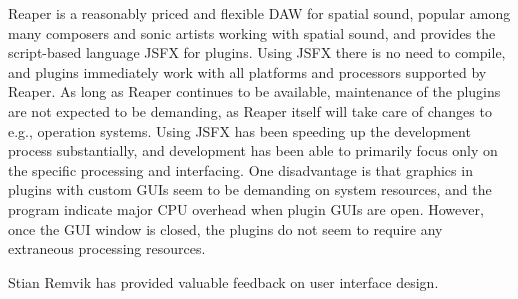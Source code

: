 \documentclass{article}
\begin{document}
Reaper is a reasonably priced and flexible DAW for spatial sound, popular among many composers and sonic artists working with spatial sound, and provides the script-based language JSFX for plugins.
Using JSFX there is no need to compile, and plugins immediately work with all platforms and processors supported by Reaper.
As long as Reaper continues to be available, maintenance of the plugins are not expected to be demanding, as Reaper itself will take care of changes to e.g., operation systems.
Using JSFX has been speeding up the development process substantially, and development has been able to primarily focus only on the specific processing and interfacing.
One disadvantage is that graphics in plugins with custom GUIs seem to be demanding on system resources, and the program indicate major CPU overhead when plugin GUIs are open. However, once the GUI window is closed, the plugins do not seem to require any extraneous processing resources.




\begin{acknowledgments}
Stian Remvik has provided valuable feedback on user interface design.
\end{acknowledgments} 


\end{document}
